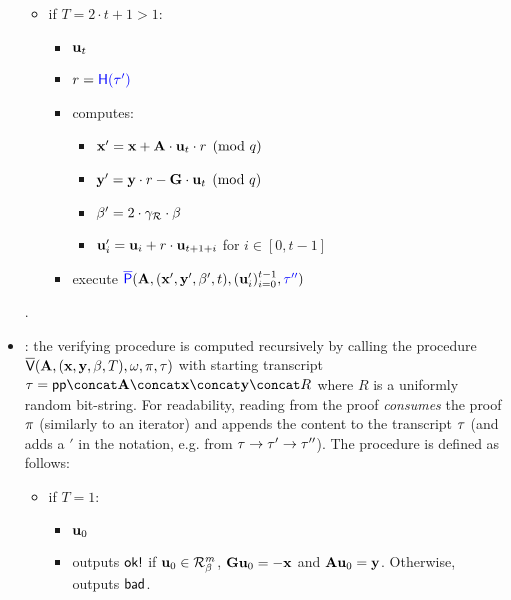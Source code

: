 \begin{itemize}
\begin{itemize}
			\item if $T = 2 \cdot t + 1 > 1$:
			\begin{itemize}
				\item {}  $\vu[t]$ 
				\item {} $r = \blue{\hashf{\transcript^\prime}}$ 
				\item {} computes:
					\begin{itemize}
						\item $\vx^\prime = \vx + \vA\cdot\vu[t]\cdot r \pmod{\qprime}$
						\item $\vy^\prime = \vy\cdot r - \vG\cdot\vu[t] \pmod{\qprime}$
						\item $\beta^\prime = 2 \cdot \gammaR \cdot \beta$
						\item $\vu[i]^\prime = \vu[i] + r\cdot\vu[t+1+i]$ for $i \in [0,t-1] $
					\end{itemize}
					
				\item {} execute
					$\blue{\proveR}(\vA,(\vx^\prime,\vy^\prime,\beta^\prime,t), (\vu[i]^\prime)_{i=0}^{t-1},
						\blue{\transcript^{\prime\prime}} )$
			\end{itemize}
		\end{itemize}
		.
	
	
	
	\item {}:
		the verifying procedure is computed
		recursively by calling the procedure
		$\verifyR(\vA,(\vx,\vy,\beta,T), \witness,\proof,\transcript)$
		with starting transcript $\transcript = \pp\concat\vA\concat\vx\concat\vy\concat R$
		where $R$ is a uniformly random bit-string.
		For readability, reading from the proof \emph{consumes} the proof $\proof$
		(similarly to an iterator) and
		appends the content to the transcript $\transcript$ (and adds a $\prime$ in the notation, e.g.
		from $\transcript \to \transcript^\prime \to \transcript^{\prime\prime}$).
		The procedure is defined as follows:
		\begin{itemize}
			\item if $T = 1$:
			\begin{itemize}
				\item {}  $\vu[0]$ 
				\item {} outputs $\textsf{ok!}$ if $\vu[0] \in \Rring[\beta]^{m}$,
					$\vG \vu[0] = -\vx$ and $\vA \vu[0] = \vy$. Otherwise, outputs $\textsf{bad}$.
			\end{itemize}
			

\end{itemize}
\end{itemize}
